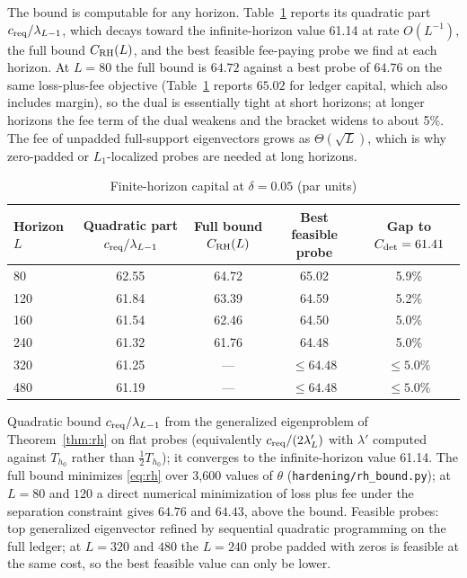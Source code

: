 The bound is computable for any horizon. Table~\ref{tab:rh} reports its quadratic part $c_{\rm req}/\lambda_{L-1}$, which decays toward the infinite-horizon value 61.14 at rate $O(L^{-1})$, the full bound $C_{\rm RH}(L)$, and the best feasible fee-paying probe we find at each horizon. At $L=80$ the full bound is $64.72$ against a best probe of $64.76$ on the same loss-plus-fee objective (Table~\ref{tab:rh} reports $65.02$ for ledger capital, which also includes margin), so the dual is essentially tight at short horizons; at longer horizons the fee term of the dual weakens and the bracket widens to about 5\%. The fee of unpadded full-support eigenvectors grows as $\Theta(\sqrt L)$, which is why zero-padded or $L_1$-localized probes are needed at long horizons.

\begin{table}[t]\centering\small
\begin{threeparttable}
\caption{Finite-horizon capital at $\delta=0.05$ (par units)}\label{tab:rh}
\setlength{\tabcolsep}{4pt}
\begin{tabular}{lcccc}
\toprule
Horizon $L$ & Quadratic part $c_{\rm req}/\lambda_{L-1}$ & Full bound $C_{\rm RH}(L)$ & Best feasible probe & Gap to $C_{\rm det}=61.41$\\
\midrule
80 & 62.55 & 64.72 & 65.02 & 5.9\%\\
120 & 61.84 & 63.39 & 64.59 & 5.2\%\\
160 & 61.54 & 62.46 & 64.50 & 5.0\%\\
240 & 61.32 & 61.76 & 64.48 & 5.0\%\\
320 & 61.25 & --- & $\le64.48$ & $\le5.0\%$\\
480 & 61.19 & --- & $\le64.48$ & $\le5.0\%$\\
\bottomrule
\end{tabular}
\begin{tablenotes}\footnotesize\item Quadratic bound $c_{\rm req}/\lambda_{L-1}$ from the generalized eigenproblem of Theorem~\ref{thm:rh} on flat probes (equivalently $c_{\rm req}/(2\lambda'_L)$ with $\lambda'$ computed against $T_{h_0}$ rather than $\tfrac12T_{h_0}$); it converges to the infinite-horizon value 61.14. The full bound minimizes \eqref{eq:rh} over 3{,}600 values of $\theta$ (\texttt{hardening/rh\_bound.py}); at $L=80$ and $120$ a direct numerical minimization of loss plus fee under the separation constraint gives $64.76$ and $64.43$, above the bound. Feasible probes: top generalized eigenvector refined by sequential quadratic programming on the full ledger; at $L=320$ and $480$ the $L=240$ probe padded with zeros is feasible at the same cost, so the best feasible value can only be lower. \end{tablenotes}
\end{threeparttable}
\end{table}

